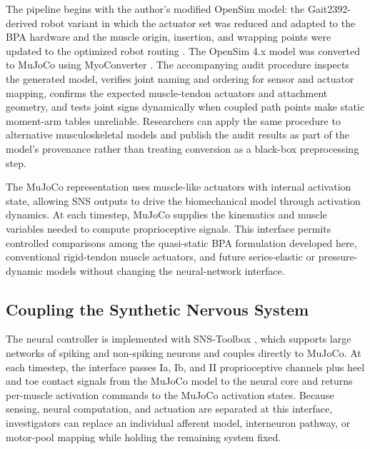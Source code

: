 The pipeline begins with the author's modified OpenSim model: the Gait2392-derived robot variant in which the actuator set was reduced and adapted to the BPA hardware and the muscle origin, insertion, and wrapping points were updated to the optimized robot routing \citep{bolen_determination_2019, morrow_optimization_2020}. The OpenSim 4.x model was converted to MuJoCo \citep{todorov_mujoco_2012} using MyoConverter \citep{caggiano_myosuite_2022, wang_myosim_2022}. The accompanying audit procedure inspects the generated model, verifies joint naming and ordering for sensor and actuator mapping, confirms the expected muscle-tendon actuators and attachment geometry, and tests joint signs dynamically when coupled path points make static moment-arm tables unreliable. Researchers can apply the same procedure to alternative musculoskeletal models and publish the audit results as part of the model's provenance rather than treating conversion as a black-box preprocessing step.

The MuJoCo representation uses muscle-like actuators with internal activation state, allowing SNS outputs to drive the biomechanical model through activation dynamics. At each timestep, MuJoCo supplies the kinematics and muscle variables needed to compute proprioceptive signals. This interface permits controlled comparisons among the quasi-static BPA formulation developed here, conventional rigid-tendon muscle actuators, and future series-elastic or pressure-dynamic models without changing the neural-network interface.

\subsection{Coupling the Synthetic Nervous System}

The neural controller is implemented with SNS-Toolbox \citep{nourse_sns_2023}, which supports large networks of spiking and non-spiking neurons and couples directly to MuJoCo. At each timestep, the interface passes Ia, Ib, and II proprioceptive channels plus heel and toe contact signals from the MuJoCo model to the neural core and returns per-muscle activation commands to the MuJoCo activation states. Because sensing, neural computation, and actuation are separated at this interface, investigators can replace an individual afferent model, interneuron pathway, or motor-pool mapping while holding the remaining system fixed.

